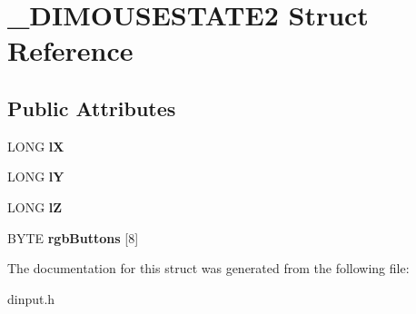 \hypertarget{struct___d_i_m_o_u_s_e_s_t_a_t_e2}{\section{\-\_\-\-D\-I\-M\-O\-U\-S\-E\-S\-T\-A\-T\-E2 Struct Reference}
\label{struct___d_i_m_o_u_s_e_s_t_a_t_e2}
}
\subsection*{Public Attributes}
\begin{DoxyCompactItemize}
\item 
\hypertarget{struct___d_i_m_o_u_s_e_s_t_a_t_e2_a2ae34fe4d4ecd8a937a84c067563d1ab}{L\-O\-N\-G {\bfseries l\-X}}\label{struct___d_i_m_o_u_s_e_s_t_a_t_e2_a2ae34fe4d4ecd8a937a84c067563d1ab}

\item 
\hypertarget{struct___d_i_m_o_u_s_e_s_t_a_t_e2_a68bef4b6f7c3de26e6c60b74fbfc7f4c}{L\-O\-N\-G {\bfseries l\-Y}}\label{struct___d_i_m_o_u_s_e_s_t_a_t_e2_a68bef4b6f7c3de26e6c60b74fbfc7f4c}

\item 
\hypertarget{struct___d_i_m_o_u_s_e_s_t_a_t_e2_ab03cc6a68542bb1b9a59fb472a5d0016}{L\-O\-N\-G {\bfseries l\-Z}}\label{struct___d_i_m_o_u_s_e_s_t_a_t_e2_ab03cc6a68542bb1b9a59fb472a5d0016}

\item 
\hypertarget{struct___d_i_m_o_u_s_e_s_t_a_t_e2_ab97407e738038a61909fc6df5a80287c}{B\-Y\-T\-E {\bfseries rgb\-Buttons} \mbox{[}8\mbox{]}}\label{struct___d_i_m_o_u_s_e_s_t_a_t_e2_ab97407e738038a61909fc6df5a80287c}

\end{DoxyCompactItemize}


The documentation for this struct was generated from the following file\-:\begin{DoxyCompactItemize}
\item 
dinput.\-h\end{DoxyCompactItemize}
